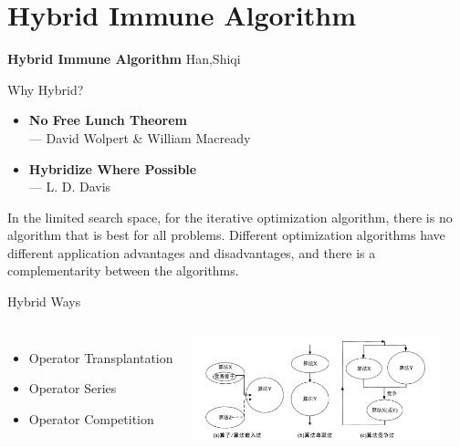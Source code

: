 
\section{Hybrid Immune Algorithm}

\begin{frame}
\Huge \textbf{Hybrid Immune Algorithm}
\large {Han,Shiqi}
\end{frame}

\begin{frame}{Why Hybrid?}
\begin{itemize}
\item {\textbf{No Free Lunch Theorem}\\ \footnotesize{--- David Wolpert \& William Macready}}
\item {\textbf{Hybridize Where Possible}\\ \footnotesize{--- L. D. Davis}}
\end{itemize}
\begin{block}
\small{In the limited search space, for the iterative optimization algorithm, there is no algorithm that is best for all problems. Different optimization algorithms have different application advantages and disadvantages, and there is a complementarity between the algorithms.}
\end{block}
\end{frame}

\begin{frame}{Hybrid Ways}
\begin{columns}[c] 
\begin{itemize}
\item {Operator Transplantation}
\item {Operator Series}
\item {Operator Competition}
\end{itemize}
\includegraphics[height=3cm]{img/hybrid_immune.jpg}
\end{columns}
\end{frame}

